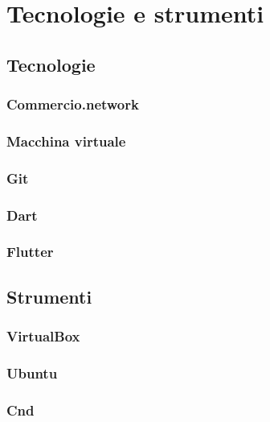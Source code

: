 
\chapter{Tecnologie e strumenti}
\label{cap:tecnologie-strumenti}

\section{Tecnologie}

\subsection*{Commercio.network}

\subsection*{Macchina virtuale}

\subsection*{Git}

\subsection*{Dart}

\subsection*{Flutter}

\section{Strumenti}

\subsection*{VirtualBox}

\subsection*{Ubuntu}

\subsection*{Cnd}

